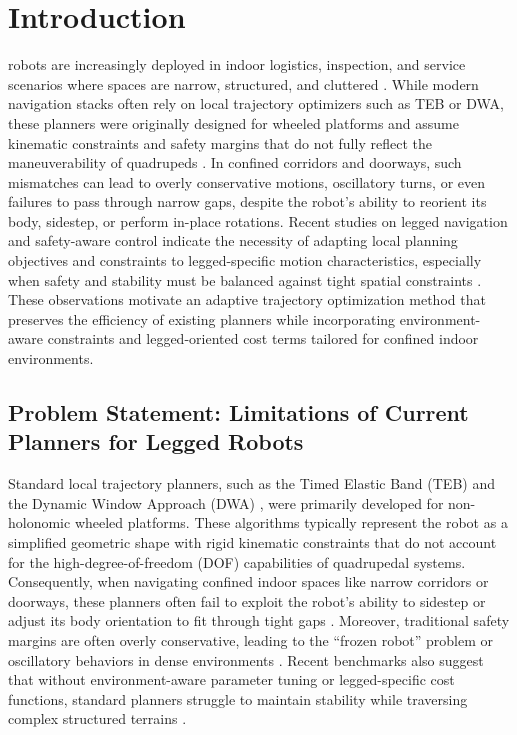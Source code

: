 \documentclass[lettersize,journal]{IEEEtran}
\begin{document}
\section{Introduction}
 robots are increasingly deployed in indoor logistics, inspection, and service scenarios where spaces are narrow, structured, and cluttered \cite{tandonAutonomousNavigationQuadruped2025}. While modern navigation stacks often rely on local trajectory optimizers such as TEB or DWA, these planners were originally designed for wheeled platforms and assume kinematic constraints and safety margins that do not fully reflect the maneuverability of quadrupeds \cite{rosmannTrajectoryOptimizationUsing2017, foxDynamicWindowApproach1997}. In confined corridors and doorways, such mismatches can lead to overly conservative motions, oscillatory turns, or even failures to pass through narrow gaps, despite the robot's ability to reorient its body, sidestep, or perform in-place rotations. Recent studies on legged navigation and safety-aware control indicate the necessity of adapting local planning objectives and constraints to legged-specific motion characteristics, especially when safety and stability must be balanced against tight spatial constraints \cite{zhangAgileSafeTrajectory2024, jiSafeMotionPlanning2024}. These observations motivate an adaptive trajectory optimization method that preserves the efficiency of existing planners while incorporating environment-aware constraints and legged-oriented cost terms tailored for confined indoor environments.

\subsection{Problem Statement: Limitations of Current Planners for Legged Robots}
Standard local trajectory planners, such as the Timed Elastic Band (TEB) \cite{rosmannTrajectoryOptimizationUsing2017} and the Dynamic Window Approach (DWA) \cite{foxDynamicWindowApproach1997}, were primarily developed for non-holonomic wheeled platforms. These algorithms typically represent the robot as a simplified geometric shape with rigid kinematic constraints that do not account for the high-degree-of-freedom (DOF) capabilities of quadrupedal systems. Consequently, when navigating confined indoor spaces like narrow corridors or doorways, these planners often fail to exploit the robot's ability to sidestep or adjust its body orientation to fit through tight gaps \cite{zhangAgileSafeTrajectory2024}. Moreover, traditional safety margins are often overly conservative, leading to the ``frozen robot'' problem or oscillatory behaviors in dense environments \cite{chenOptimizationbasedNavigationMobile2018, hsuBridgeTestSampling2003}. Recent benchmarks also suggest that without environment-aware parameter tuning or legged-specific cost functions, standard planners struggle to maintain stability while traversing complex structured terrains \cite{macenskiBenchmarkingLocalPlanners2024, tandonAutonomousNavigationQuadruped2025}.
\end{document}
